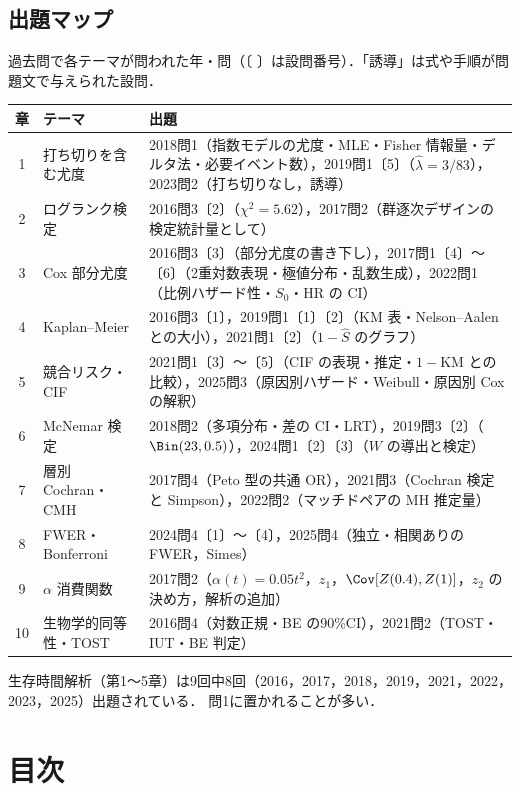 \section*{出題マップ}
過去問で各テーマが問われた年・問（〔 〕は設問番号）．「誘導」は式や手順が問題文で与えられた設問．
\begin{center}\small
\begin{tabular}{@{}clL{100mm}@{}}
\toprule
章 & テーマ & 出題\\
 & 打ち切りを含む尤度 & 2018問1（指数モデルの尤度・MLE・Fisher 情報量・デルタ法・必要イベント数），2019問1〔5〕（$\hat\lambda=3/83$），2023問2（打ち切りなし，誘導）\\
2 & ログランク検定 & 2016問3〔2〕（$\chi^2=5.62$），2017問2（群逐次デザインの検定統計量として）\\
3 & Cox 部分尤度 & 2016問3〔3〕（部分尤度の書き下し），2017問1〔4〕〜〔6〕（2重対数表現・極値分布・乱数生成），2022問1（比例ハザード性・$S_0$・HR の CI）\\
4 & Kaplan--Meier & 2016問3〔1〕，2019問1〔1〕〔2〕（KM 表・Nelson--Aalen との大小），2021問1〔2〕（$1-\hat S$ のグラフ）\\
5 & 競合リスク・CIF & 2021問1〔3〕〜〔5〕（CIF の表現・推定・$1-\mathrm{KM}$ との比較），2025問3（原因別ハザード・Weibull・原因別 Cox の解釈）\\
6 & McNemar 検定 & 2018問2（多項分布・差の CI・LRT），2019問3〔2〕（$\Bin(23,0.5)$），2024問1〔2〕〔3〕（$W$ の導出と検定）\\
7 & 層別 Cochran・CMH & 2017問4（Peto 型の共通 OR），2021問3（Cochran 検定と Simpson），2022問2（マッチドペアの MH 推定量）\\
8 & FWER・Bonferroni & 2024問4〔1〕〜〔4〕，2025問4（独立・相関ありの FWER，Simes）\\
9 & $\alpha$ 消費関数 & 2017問2（$\alpha(t)=0.05t^2$，$z_1$，$\Cov[Z(0.4),Z(1)]$，$z_2$ の決め方，解析の追加）\\
10 & 生物学的同等性・TOST & 2016問4（対数正規・BE の90\%CI），2021問2（TOST・IUT・BE 判定）\\
\bottomrule
\end{tabular}
\end{center}
生存時間解析（第1〜5章）は9回中8回（2016，2017，2018，2019，2021，2022，2023，2025）出題されている．
問1に置かれることが多い．

\chapter*{目次}
\begin{multicols}{2}\footnotesize\sloppy
\makeatletter{}\makeatother
\end{multicols}

\clearpage\makeatletter\@mainmattertrue\makeatother
{}

